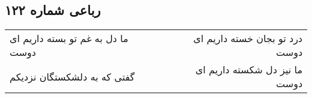 \begin{center}
\section*{رباعی شماره ۱۲۲}
\label{sec:sh122}
\begin{longtable}{l p{0.5cm} r}
ما دل به غم تو بسته داریم ای دوست
&&
درد تو بجان خسته داریم ای دوست
\\
گفتی که به دلشکستگان نزدیکم
&&
ما نیز دل شکسته داریم ای دوست
\\
\end{longtable}
\end{center}
